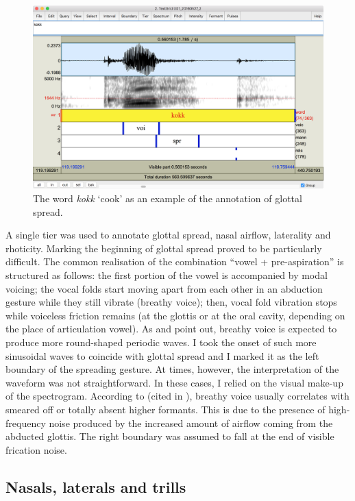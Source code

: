 \documentclass[11pt,a4paper,openany]{memoir}\usepackage[]{graphicx}\usepackage[]{color}
\begin{document}
\begin{figure}
\centering
\includegraphics[width=\textwidth]{glottal}
\caption{The word \textit{kokk} `cook' as an example of the annotation of glottal spread.}
\label{f:glottal}
\end{figure}


A single tier was used to annotate glottal spread, nasal airflow, laterality and rhoticity.
Marking the beginning of glottal spread proved to be particularly difficult.
The common realisation of the combination ``vowel + pre-aspiration'' is structured as follows: the first portion of the vowel is accompanied by modal voicing; the vocal folds start moving apart from each other in an abduction gesture while they still vibrate (breathy voice); then, vocal fold vibration stops while voiceless friction remains (at the glottis or at the oral cavity, depending on the place of articulation vowel).
As \citet{khan2012} and \citet{nance2013} point out, breathy voice is expected to produce more round-shaped periodic waves.
I took the onset of such more sinusoidal waves to coincide with glottal spread and I marked it as the left boundary of the spreading gesture.
At times, however, the interpretation of the waveform was not straightforward.
In these cases, I relied on the visual make-up of the spectrogram.
According to \citet{jones2006} (cited in \citet[134]{nance2013}), breathy voice usually correlates with smeared off or totally absent higher formants.
This is due to the presence of high-frequency noise produced by the increased amount of airflow coming from the abducted glottis.
The right boundary was assumed to fall at the end of visible frication noise.

\subsection{Nasals, laterals and trills}
\end{document}
